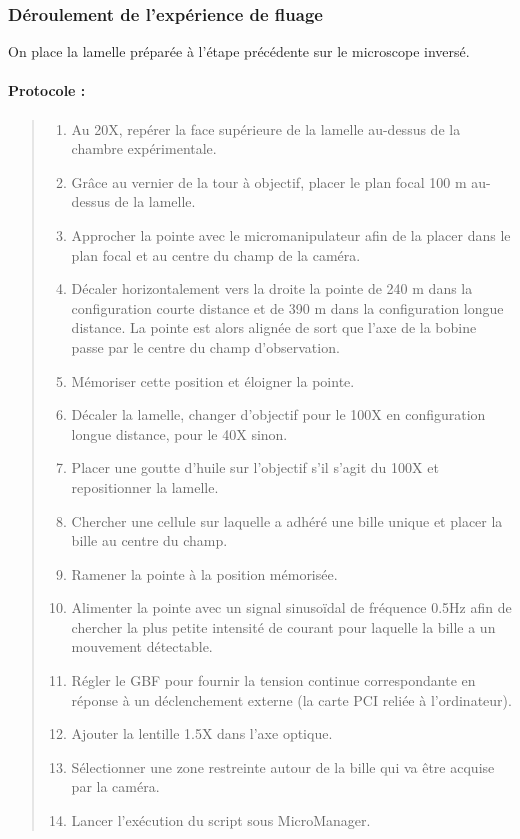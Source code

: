 	\subsubsection{Déroulement de l'expérience de fluage}
	
	On place la lamelle préparée à l'étape précédente sur le microscope inversé. 
	\paragraph{Protocole : }
	\begin{quote}
	\begin{enumerate}
	\item Au 20X, repérer la face supérieure de la lamelle au-dessus de la chambre expérimentale.
	\item Grâce au vernier de la tour à objectif, placer le plan focal 100 \micro m au-dessus de la lamelle. 
	\item Approcher la pointe avec le micromanipulateur afin de la placer dans le plan focal et au centre du champ de la caméra. 
	\item Décaler horizontalement vers la droite la pointe de 240 \micro m dans la configuration courte distance et de 390 \micro m dans la configuration longue distance. La pointe est alors alignée de sort que l'axe de la bobine passe par le centre du champ d'observation. 
	\item Mémoriser cette position et éloigner la pointe.
	\item Décaler la lamelle, changer d'objectif pour le 100X en configuration longue distance, pour le 40X sinon.
	\item Placer une goutte d'huile sur l'objectif s'il s'agit du 100X et repositionner la lamelle. 
	\item Chercher une cellule sur laquelle a adhéré une bille unique et placer la bille au centre du champ.
	\item Ramener la pointe à la position mémorisée.
	\item Alimenter la pointe avec un signal sinusoïdal de fréquence 0.5Hz afin de chercher la plus petite intensité de courant pour laquelle la bille a un mouvement détectable. 
	\item Régler le GBF pour fournir la tension continue correspondante en réponse à un déclenchement externe (la carte PCI reliée à l'ordinateur). 
	\item Ajouter la lentille 1.5X dans l'axe optique.
	\item Sélectionner une zone restreinte autour de la bille qui va être acquise par la caméra.
	\item Lancer l'exécution du script sous MicroManager.
	\end{enumerate}
	\end{quote}
	
